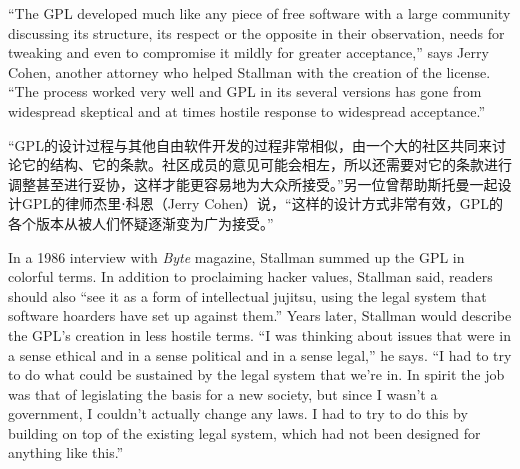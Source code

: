 \ifdefined\eng
``The GPL developed much like any piece of free software with a large community discussing its structure, its respect or the opposite in their observation, needs for tweaking and even to compromise it mildly for greater acceptance,'' says Jerry Cohen, another attorney who helped Stallman with the creation of the license. ``The process worked very well and GPL in its several versions has gone from widespread skeptical and at times hostile response to widespread acceptance.''
\fi

\ifdefined\chs
``GPL的设计过程与其他自由软件开发的过程非常相似，由一个大的社区共同来讨论它的结构、它的条款。社区成员的意见可能会相左，所以还需要对它的条款进行调整甚至进行妥协，这样才能更容易地为大众所接受。''另一位曾帮助斯托曼一起设计GPL的律师杰里⋅科恩（Jerry Cohen）说，``这样的设计方式非常有效，GPL的各个版本从被人们怀疑逐渐变为广为接受。''
\fi

\ifdefined\eng
In a 1986 interview with \textit{Byte} magazine, Stallman summed up the GPL in colorful terms. In addition to proclaiming hacker values, Stallman said, readers should also ``see it as a form of intellectual jujitsu, using the legal system that software hoarders have set up against them.'' Years later, Stallman would describe the GPL's creation in less hostile terms. ``I was thinking about issues that were in a sense ethical and in a sense political and in a sense legal,'' he says. ``I had to try to do what could be sustained by the legal system that we're in. In spirit the job was that of legislating the basis for a new society, but since I wasn't a government, I couldn't actually change any laws. I had to try to do this by building on top of the existing legal system, which had not been designed for anything like this.''
\fi

